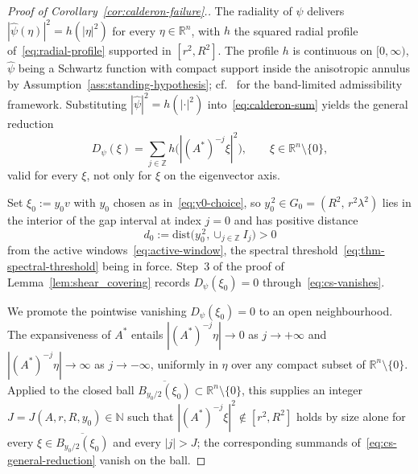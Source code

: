 \documentclass[pdflatex,sn-basic,Numbered]{sn-jnl}
\theoremstyle{thmstyleone}%
\theoremstyle{thmstylethree}%
\begin{document}
\begin{proof}[Proof of Corollary~\ref{cor:calderon-failure}.]
	The radiality of $\psi$ delivers $|\widehat{\psi}(\eta)|^2 = h(|\eta|^2)$
	for every $\eta \in \mathbb{R}^n$, with $h$ the squared radial profile
	of~\eqref{eq:radial-profile} supported in $[r^2, R^2]$. The profile
	$h$ is continuous on $[0, \infty)$, $\widehat{\psi}$ being a Schwartz
	function with compact support inside the anisotropic annulus by
	Assumption~\ref{ass:standing-hypothesis};
	cf.\ \cite[Definition~2.12, eq.~(2.7)]{Bownik2007} for the band-limited admissibility
	framework. Substituting $|\widehat{\psi}|^2 = h(|\cdot|^2)$
	into~\eqref{eq:calderon-sum} yields the general reduction
	\begin{equation}\label{eq:cs-general-reduction}
		D_\psi(\xi)  =  \sum_{j \in \mathbb{Z}} h\!\bigl( |(A^*)^{-j}\xi|^2 \bigr),
		\qquad \xi \in \mathbb{R}^n \setminus \{0\} ,
	\end{equation}
	valid for every $\xi$, not only for $\xi$ on the eigenvector axis.
	
	Set $\xi_0 := y_0 v$ with $y_0$ chosen as in~\eqref{eq:y0-choice}, so
	$y_0^{\,2} \in G_0 = (R^2,\, r^2 \lambda^2)$ lies in the interior of
	the gap interval at index $j = 0$ and has positive distance
	\begin{equation}\label{eq:gap-distance}
		d_0  :=  \mathrm{dist}\!\bigl( y_0^{\,2},  \cup_{j \in \mathbb{Z}} I_j \bigr)
		 >  0
	\end{equation}
	from the active windows~\eqref{eq:active-window}, the spectral
	threshold~\eqref{eq:thm-spectral-threshold} being in force. Step~3 of
	the proof of Lemma~\ref{lem:shear_covering} records $D_\psi(\xi_0) = 0$
	through~\eqref{eq:cs-vanishes}.
	
	We promote the pointwise vanishing $D_\psi(\xi_0) = 0$ to an open
	neighbourhood. The expansiveness of $A^*$
	\cite[Section~1.2]{Bownik2003} entails $|(A^*)^{-j}\eta| \to 0$ as
	$j \to +\infty$ and $|(A^*)^{-j}\eta| \to \infty$ as $j \to -\infty$,
	uniformly in $\eta$ over any compact subset of $\mathbb{R}^n
	\setminus \{0\}$. Applied to the closed ball
	$\overline{B_{y_0/2}(\xi_0)} \subset \mathbb{R}^n \setminus \{0\}$,
	this supplies an integer $J = J(A, r, R, y_0) \in \mathbb{N}$ such
	that $|(A^*)^{-j}\xi|^2 \notin [r^2, R^2]$ holds by size alone for
	every $\xi \in \overline{B_{y_0/2}(\xi_0)}$ and every $|j| > J$; the
	corresponding summands of~\eqref{eq:cs-general-reduction} vanish on
	the ball.
	

\end{proof}
\end{document}
